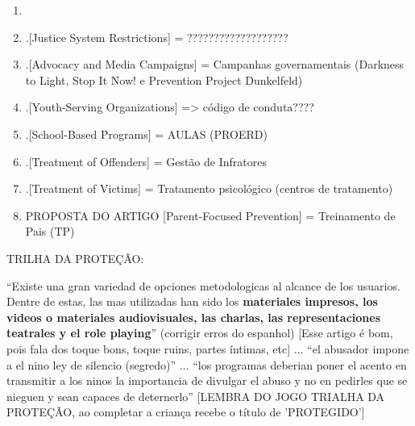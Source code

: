 \begin{enumerate}
    \item \cite{mendelson2015parent}
  
    \item .[Justice System Restrictions] = ???????????????????
  
    \item .[Advocacy and Media Campaigns] = Campanhas governamentais (Darkness to Light, Stop It Now! e Prevention Project Dunkelfeld)
  
    \item .[Youth-Serving Organizations] => código de conduta????
  
    \item .[School-Based Programs] = AULAS (PROERD)
  
    \item .[Treatment of Offenders] = Gestão de Infratores
  
    \item .[Treatment of Victims] = Tratamento psicológico (centros de tratamento)
    
    \item PROPOSTA DO ARTIGO [Parent-Focused Prevention] = Treinamento de Pais (TP)
  \end{enumerate}

  TRILHA DA PROTEÇÃO: \cite{meyer2017analise}

  ``Existe una gran variedad de opciones metodologicas al alcance de los usuarios. Dentre de estas, las mas utilizadas han sido los \textbf{materiales impresos, los videos o materiales audiovisuales, las charlas, las representaciones teatrales y el role playing}'' (corrigir erros do espanhol) [Esse artigo é bom, pois fala dos toque bons, toque ruins, partes íntimas, etc] ... ``el abusador impone a el nino ley de silencio (segredo)'' ... ``los programas deberian poner el acento en transmitir a los ninos la importancia de divulgar el abuso y no en pedirles que se nieguen y sean capaces de deternerlo'' [LEMBRA DO JOGO TRIALHA DA PROTEÇÃO, ao completar a criança recebe o título de 'PROTEGIDO'] \cite{martinez2011prevencion} 

